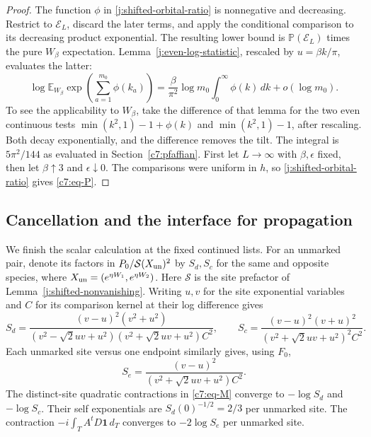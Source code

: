 \begin{proof}
The function $\phi$ in \eqref{j:shifted-orbital-ratio} is
nonnegative and decreasing. Restrict to $\mathcal E_L$, discard
the later terms, and apply the conditional comparison to its
decreasing product exponential. The resulting lower bound is
$\mathbb P(\mathcal E_L)$ times the pure $W_\beta$ expectation.
Lemma~\ref{j:even-log-statistic}, rescaled by $u=\beta k/\pi$,
evaluates the latter:
\[
 \log\mathbb E_{W_\beta}\exp\left(\sum_{a=1}^{m_0}\phi(k_a)\right)
 =\frac{\beta}{\pi^2}\log m_0\int_0^\infty\phi(k)\,dk
       +o(\log m_0).
\]
To see the applicability to $W_\beta$, take the difference of that
lemma for the two even continuous tests
$\min(k^2,1)-1+\phi(k)$ and $\min(k^2,1)-1$, after rescaling.
Both decay exponentially, and the difference removes the tilt.
The integral is $5\pi^2/144$ as evaluated in
Section~\ref{c7:pfaffian}. First let $L\to\infty$ with
$\beta,\epsilon$ fixed, then let $\beta\uparrow3$ and
$\epsilon\downarrow0$. The comparisons were uniform in $h$, so
\eqref{j:shifted-orbital-ratio} gives \eqref{c7:eq-P}.
\end{proof}

\subsection{Cancellation and the interface for propagation}

We finish the scalar calculation at the fixed continued lists.
For an unmarked pair, denote its factors in
$P_0/\mathcal S(X_{\rm un})^2$ by $S_d,S_c$ for the same and
opposite species, where
$X_{\rm un}=(e^{\eta W_1},e^{\eta W_2})$. Here $\mathcal S$ is
the site prefactor of Lemma~\ref{j:shifted-nonvanishing}.
Writing $u,v$ for the site exponential variables and $C$ for its
comparison kernel at their log difference gives
\[
 S_d=\frac{(v-u)^2(v^2+u^2)}
 {(v^2-\sqrt2uv+u^2)(v^2+\sqrt2uv+u^2)C^2},\qquad
 S_c=\frac{(v-u)^2(v+u)^2}
 {(v^2+\sqrt2uv+u^2)^2C^2}.
\]
Each unmarked site versus one endpoint similarly gives, using
$F_0$,
\[
 S_e=\frac{(v-u)^2}{(v^2+\sqrt2uv+u^2)C^2}.
\]
The distinct-site quadratic contractions in \eqref{c7:eq-M}
converge to $-\log S_d$ and $-\log S_c$. Their self
exponentials are $S_d(0)^{-1/2}=2/3$ per unmarked site.
The contraction $-i\int_T A^tD\mathbf1\,d_T$ converges to
$-2\log S_e$ per unmarked site.

